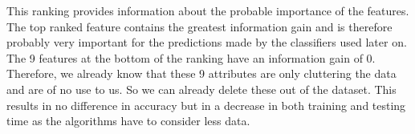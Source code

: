 This ranking provides information about the probable importance of the features. The top ranked feature contains the greatest information gain and is therefore probably very important for the predictions made by the classifiers used later on.
The 9 features at the bottom of the ranking have an information gain of 0. Therefore, we already know that these 9 attributes are only cluttering the data and are of no use to us. So we can already delete these out of the dataset. This results in no difference in accuracy but in a decrease in both training and testing time as the algorithms have to consider less data.










